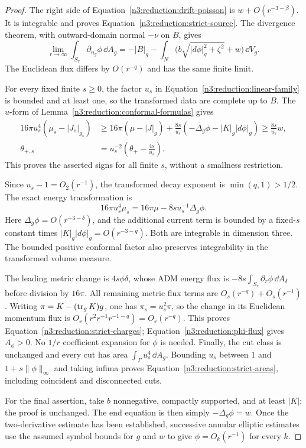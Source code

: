 \begin{proof}
The right side of Equation~\eqref{n3:reduction:drift-poisson} is
$w+O(r^{-3-\beta})$.  It is integrable and proves
Equation~\eqref{n3:reduction:strict-source}.  The divergence theorem, with
outward-domain normal $-\nu$ on $B$, gives
\begin{equation}
 \label{n3:reduction:phi-flux}
 \lim_{r\to\infty}\int_{S_r}\partial_{n_g}\phi\,\dd A_g
 =-|B|_g-\int_N
       \bigl(b\sqrt{|d\phi|_g^2+\zeta^2}+w\bigr)\,\dd V_g.
\end{equation}
The Euclidean flux differs by $O(r^{-q})$ and has the same finite limit.

For every fixed finite $s\ge0$, the factor $u_s$ in
Equation~\eqref{n3:reduction:linear-family} is bounded and at least one,
so the transformed data are complete up to $B$.
The $u$-form of Lemma~\ref{n3:reduction:conformal-formulas} gives
\begin{align*}
 16\pi u_s^4(\mu_s-|J_s|_{g_s})
 &\ge16\pi(\mu-|J|_g)
        +\frac{8s}{u_s}(-\Delta_g\phi-|K|_g|d\phi|_g)
 \ge \frac{8s}{u_s}w,\\
 \theta_{+,s}
 &=u_s^{-2}\left(\theta_+-\frac{4s}{u_s}\right).
\end{align*}
This proves the asserted signs for all finite $s$, without a smallness
restriction.

Since $u_s-1=O_2(r^{-1})$, the transformed decay exponent is
$\min(q,1)>1/2$.  The exact energy transformation is
\[
 16\pi u_s^4\mu_s=16\pi\mu-8s u_s^{-1}\Delta_g\phi.
\]
Here $\Delta_g\phi=O(r^{-3-\delta})$, and the additional current term
is bounded by a fixed-$s$ constant times
$|K|_g|d\phi|_g=O(r^{-3-q})$.  Both are integrable in dimension three.
The bounded positive conformal factor also preserves integrability in
the transformed volume measure.

The leading metric change is $4s\phi\delta$, whose ADM energy flux
is $-8s\int_{S_r}\partial_r\phi\,\dd A_\delta$ before division by
$16\pi$.  All remaining metric flux terms are
$O_s(r^{-q})+O_s(r^{-1})$.  Writing $\pi=K-(\operatorname{tr}_gK)g$, one has
$\pi_s=u_s^2\pi$, so the change in its Euclidean momentum flux is
$O_s(r^2r^{-1}r^{-1-q})=O_s(r^{-q})$.
This proves Equation~\eqref{n3:reduction:strict-charges};
Equation~\eqref{n3:reduction:phi-flux} gives $A_\phi>0$.
No $1/r$ coefficient expansion for $\phi$ is needed.
Finally, the cut class is unchanged and every cut has area
$\int_\Gamma u_s^4\,\dd A_g$.  Bounding $u_s$ between $1$ and
$1+s\|\phi\|_\infty$ and taking infima proves
Equation~\eqref{n3:reduction:strict-areas}, including coincident and
disconnected cuts.

For the final assertion, take $b$ nonnegative, compactly supported, and
at least $|K|$; the proof is unchanged.  The end equation is then simply
$-\Delta_g\phi=w$.  Once the two-derivative estimate has been established,
successive annular elliptic estimates use the assumed symbol bounds for
$g$ and $w$ to give $\phi=O_k(r^{-1})$ for every $k$.
\end{proof}

